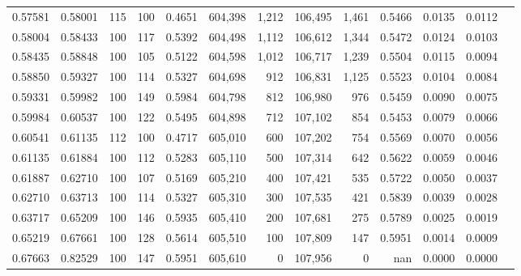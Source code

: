 \begin{tabular}{rrrrrrrrrrrrr}
0.57581 & 0.58001 &   115 & 100 &                                     0.4651 & 604,398 &   1,212 & 106,495 &   1,461 & 0.5466 & 0.0135 & 0.0112 \\
0.58004 & 0.58433 &   100 & 117 &                                     0.5392 & 604,498 &   1,112 & 106,612 &   1,344 & 0.5472 & 0.0124 & 0.0103 \\
0.58435 & 0.58848 &   100 & 105 &                                     0.5122 & 604,598 &   1,012 & 106,717 &   1,239 & 0.5504 & 0.0115 & 0.0094 \\
0.58850 & 0.59327 &   100 & 114 &                                     0.5327 & 604,698 &     912 & 106,831 &   1,125 & 0.5523 & 0.0104 & 0.0084 \\
0.59331 & 0.59982 &   100 & 149 &                                     0.5984 & 604,798 &     812 & 106,980 &     976 & 0.5459 & 0.0090 & 0.0075 \\
0.59984 & 0.60537 &   100 & 122 &                                     0.5495 & 604,898 &     712 & 107,102 &     854 & 0.5453 & 0.0079 & 0.0066 \\
0.60541 & 0.61135 &   112 & 100 &                                     0.4717 & 605,010 &     600 & 107,202 &     754 & 0.5569 & 0.0070 & 0.0056 \\
0.61135 & 0.61884 &   100 & 112 &                                     0.5283 & 605,110 &     500 & 107,314 &     642 & 0.5622 & 0.0059 & 0.0046 \\
0.61887 & 0.62710 &   100 & 107 &                                     0.5169 & 605,210 &     400 & 107,421 &     535 & 0.5722 & 0.0050 & 0.0037 \\
0.62710 & 0.63713 &   100 & 114 &                                     0.5327 & 605,310 &     300 & 107,535 &     421 & 0.5839 & 0.0039 & 0.0028 \\
0.63717 & 0.65209 &   100 & 146 &                                     0.5935 & 605,410 &     200 & 107,681 &     275 & 0.5789 & 0.0025 & 0.0019 \\
0.65219 & 0.67661 &   100 & 128 &                                     0.5614 & 605,510 &     100 & 107,809 &     147 & 0.5951 & 0.0014 & 0.0009 \\
0.67663 & 0.82529 &   100 & 147 &                                     0.5951 & 605,610 &       0 & 107,956 &       0 &    nan & 0.0000 & 0.0000 \\
\bottomrule
\end{tabular}
